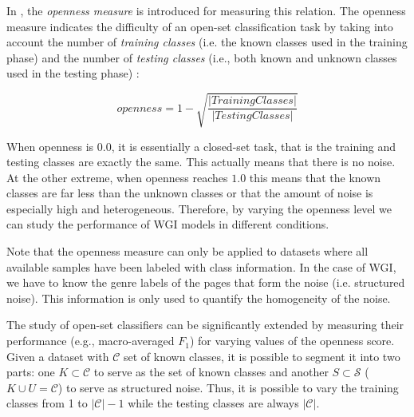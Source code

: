 In \parencite{scheirer2013toward}, the \textit{openness measure} is introduced for measuring this relation. The openness measure indicates the difficulty of an open-set classification task by taking into account the number of \textit{training classes} (i.e. the known classes used in the training phase) and the number of \textit{testing classes} (i.e., both known and unknown classes used in the testing phase) \parencite{mendesjunior2016}:

\begin{equation}\label{chap:eval_methods:eq:openness}
	openness=1-\sqrt{\frac{ | Training Classes | }{ |Testing Classes | }}
\end{equation}

When openness is $0.0$, it is essentially a closed-set task, that is the training and testing classes are exactly the same. This actually means that there is no noise. At the other extreme, when openness reaches $1.0$ this means that the known classes are far less than the unknown classes or that the amount of noise is especially high and heterogeneous. Therefore, by varying the openness level we can study the performance of WGI models in different conditions.

Note that the openness measure can only be applied to datasets where all available samples have been labeled with class information. In the case of WGI, we have to know the genre labels of the pages that form the noise (i.e. structured noise). This information is only used to quantify the homogeneity of the noise.

The study of open-set classifiers can be significantly extended by measuring their performance (e.g., macro-averaged $F_{1}$) for varying values of the openness score. Given a dataset with $\mathcal{C}$ set of known classes, it is possible to segment it into two parts: one $K \subset \mathcal{C}$ to serve as the set of known classes and another $S \subset  \mathcal{S}$ ($K \cup U = \mathcal{C}$) to serve as structured noise. Thus, it is possible to vary the training classes from 1 to $|\mathcal{C}|-1$ while the testing classes are always $|\mathcal{C}|$. 

